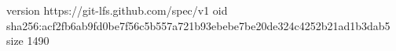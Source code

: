 version https://git-lfs.github.com/spec/v1
oid sha256:acf2fb6ab9fd0be7f56c5b557a721b93ebebe7be20de324c4252b21ad1b3dab5
size 1490
